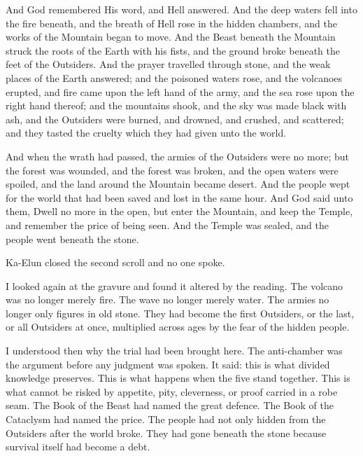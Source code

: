 \begin{scripture}
And God remembered His word, and Hell answered.
And the deep waters fell into the fire beneath, and the breath of Hell rose in the hidden chambers, and the works of the Mountain began to move.
And the Beast beneath the Mountain struck the roots of the Earth with his fists, and the ground broke beneath the feet of the Outsiders.
And the prayer travelled through stone, and the weak places of the Earth answered; and the poisoned waters rose, and the volcanoes erupted, and fire came upon the left hand of the army, and the sea rose upon the right hand thereof; and the mountains shook, and the sky was made black with ash, and the Outsiders were burned, and drowned, and crushed, and scattered; and they tasted the cruelty which they had given unto the world.
\end{scripture}

\begin{scripture}
And when the wrath had passed, the armies of the Outsiders were no more; but the forest was wounded, and the forest was broken, and the open waters were spoiled, and the land around the Mountain became desert.
And the people wept for the world that had been saved and lost in the same hour.
And God said unto them, Dwell no more in the open, but enter the Mountain, and keep the Temple, and remember the price of being seen.
And the Temple was sealed, and the people went beneath the stone.
\end{scripture}

Ka-Elun closed the second scroll and no one spoke.\par

I looked again at the gravure and found it altered by the reading. The volcano was no longer merely fire. The wave no longer merely water. The armies no longer only figures in old stone. They had become the first Outsiders, or the last, or all Outsiders at once, multiplied across ages by the fear of the hidden people.\par

I understood then why the trial had been brought here. The anti-chamber was the argument before any judgment was spoken. It said: this is what divided knowledge preserves. This is what happens when the five stand together. This is what cannot be risked by appetite, pity, cleverness, or proof carried in a robe seam. The Book of the Beast had named the great defence. The Book of the Cataclysm had named the price. The people had not only hidden from the Outsiders after the world broke. They had gone beneath the stone because survival itself had become a debt.\par


